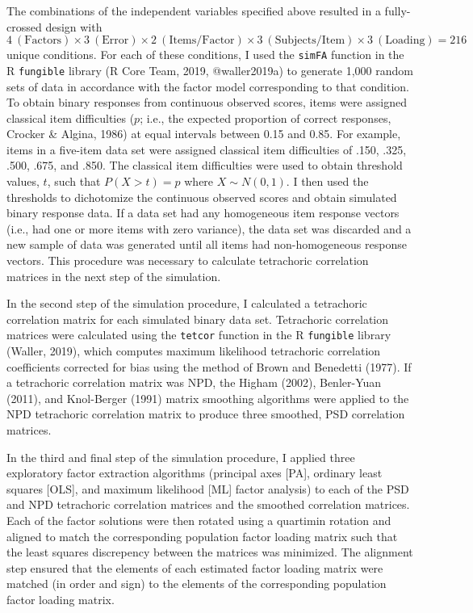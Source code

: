 \documentclass[man]{apa6}
\begin{document}
The combinations of the independent variables specified above resulted in a fully-crossed design with \(4 \: (\textrm{Factors}) \times 3 \: (\textrm{Error}) \times 2 \: (\textrm{Items/Factor}) \times 3 \: (\textrm{Subjects/Item}) \times 3 \: (\textrm{Loading}) = 216\) unique conditions. For each of these conditions, I used the \texttt{simFA} function in the R \texttt{fungible} library (R Core Team, 2019, @waller2019a) to generate 1,000 random sets of data in accordance with the factor model corresponding to that condition. To obtain binary responses from continuous observed scores, items were assigned classical item difficulties (\(p\); i.e., the expected proportion of correct responses, Crocker \& Algina, 1986) at equal intervals between 0.15 and 0.85. For example, items in a five-item data set were assigned classical item difficulties of .150, .325, .500, .675, and .850. The classical item difficulties were used to obtain threshold values, \(t\), such that \(P(X > t) = p\) where \(X \sim N(0,1)\). I then used the thresholds to dichotomize the continuous observed scores and obtain simulated binary response data. If a data set had any homogeneous item response vectors (i.e., had one or more items with zero variance), the data set was discarded and a new sample of data was generated until all items had non-homogeneous response vectors. This procedure was necessary to calculate tetrachoric correlation matrices in the next step of the simulation.

In the second step of the simulation procedure, I calculated a tetrachoric correlation matrix for each simulated binary data set. Tetrachoric correlation matrices were calculated using the \texttt{tetcor} function in the R \texttt{fungible} library (Waller, 2019), which computes maximum likelihood tetrachoric correlation coefficients corrected for bias using the method of Brown and Benedetti (1977). If a tetrachoric correlation matrix was NPD, the Higham (2002), Benler-Yuan (2011), and Knol-Berger (1991) matrix smoothing algorithms were applied to the NPD tetrachoric correlation matrix to produce three smoothed, PSD correlation matrices.

In the third and final step of the simulation procedure, I applied three exploratory factor extraction algorithms (principal axes {[}PA{]}, ordinary least squares {[}OLS{]}, and maximum likelihood {[}ML{]} factor analysis) to each of the PSD and NPD tetrachoric correlation matrices and the smoothed correlation matrices. Each of the factor solutions were then rotated using a quartimin rotation and aligned to match the corresponding population factor loading matrix such that the least squares discrepency between the matrices was minimized. The alignment step ensured that the elements of each estimated factor loading matrix were matched (in order and sign) to the elements of the corresponding population factor loading matrix.
\end{document}
